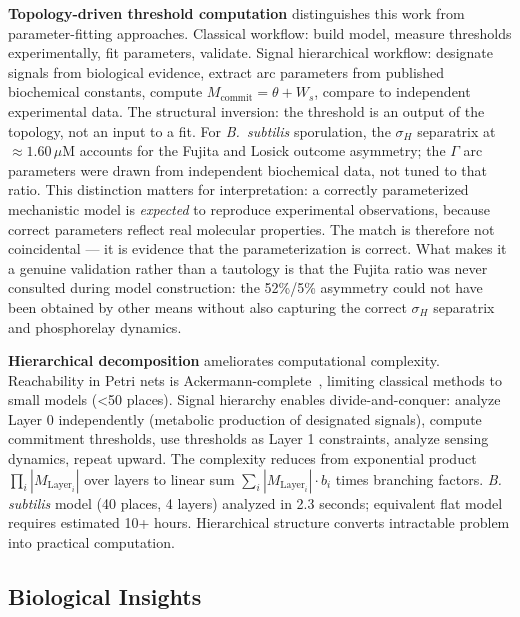 \documentclass[10pt,letterpaper]{article}
\begin{document}
\textbf{Topology-driven threshold computation} distinguishes this work from parameter-fitting approaches. Classical workflow: build model, measure thresholds experimentally, fit parameters, validate. Signal hierarchical workflow: designate signals from biological evidence, extract arc parameters from published biochemical constants, compute $M_{\text{commit}} = \theta + W_s$, compare to independent experimental data. The structural inversion: the threshold is an output of the topology, not an input to a fit. For \textit{B.\ subtilis} sporulation, the $\sigma_H$ separatrix at $\approx 1.60\,\mu$M accounts for the Fujita and Losick outcome asymmetry; the $\Gamma$ arc parameters were drawn from independent biochemical data, not tuned to that ratio. This distinction matters for interpretation: a correctly parameterized mechanistic model is \textit{expected} to reproduce experimental observations, because correct parameters reflect real molecular properties. The match is therefore not coincidental --- it is evidence that the parameterization is correct. What makes it a genuine validation rather than a tautology is that the Fujita ratio was never consulted during model construction: the 52\%/5\% asymmetry could not have been obtained by other means without also capturing the correct $\sigma_H$ separatrix and phosphorelay dynamics.

\textbf{Hierarchical decomposition} ameliorates computational complexity. Reachability in Petri nets is Ackermann-complete~\cite{czerwinski2021}, limiting classical methods to small models (<50 places). Signal hierarchy enables divide-and-conquer: analyze Layer 0 independently (metabolic production of designated signals), compute commitment thresholds, use thresholds as Layer 1 constraints, analyze sensing dynamics, repeat upward. The complexity reduces from exponential product $\prod_i |M_{\text{Layer}_i}|$ over layers to linear sum $\sum_i |M_{\text{Layer}_i}| \cdot b_i$ times branching factors. \textit{B. subtilis} model (40 places, 4 layers) analyzed in 2.3 seconds; equivalent flat model requires estimated 10+ hours. Hierarchical structure converts intractable problem into practical computation.

\subsection{Biological Insights}
\end{document}
